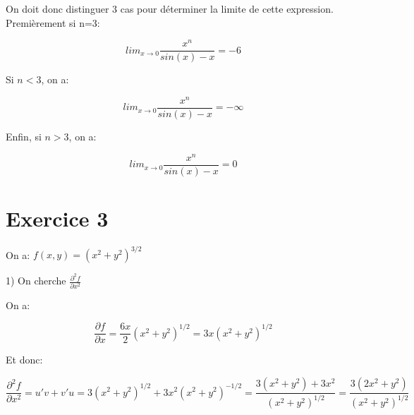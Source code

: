 \documentclass[12pt,a4paper, french]{article}
\begin{document}
On doit donc distinguer 3 cas pour déterminer la limite de cette expression. Premièrement si n=3:
\begin{center}
    \begin{equation*}
    lim_{x \to 0}\frac{x^n}{sin(x)-x}=-6
    \end{equation*}
\end{center}

Si \begin{math}
    n<3
\end{math}, on a:
\begin{center}
    \begin{equation*}
    lim_{x \to 0}\frac{x^n}{sin(x)-x}=-\infty
    \end{equation*}
\end{center}

Enfin, si \begin{math}
    n>3
\end{math}, on a:
\begin{center}
    \begin{equation*}
    lim_{x \to 0}\frac{x^n}{sin(x)-x}=0
    \end{equation*}
\end{center}
\newpage

\section*{Exercice 3}

On a: \begin{math}f(x,y)=(x^2+y^2)^{3/2}
\end{math}

1) On cherche \begin{math}
    \frac{\partial^2f}{\partial x^2}
\end{math}

On a: 
\begin{center}
    \begin{equation*}
        \frac{\partial f}{\partial x}=\frac{6x}{2}(x^2+y^2)^{1/2}=3x(x^2+y^2)^{1/2}
    \end{equation*}
\end{center}

Et donc:
\begin{center}
    \begin{equation*}
        \frac{\partial^2f}{\partial x^2}=u'v+v'u=3(x^2+y^2)^{1/2}+3x^2(x^2+y^2)^{-1/2}=\frac{3(x^2+y^2)+3x^2}{(x^2+y^2)^{1/2}}=\frac{3(2x^2+y^2)}{(x^2+y^2)^{1/2}}
    \end{equation*}
\end{center}
\end{document}
